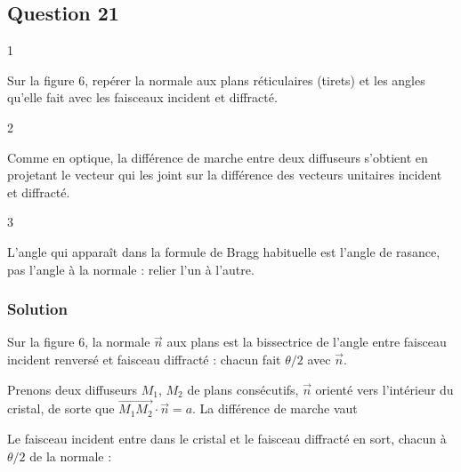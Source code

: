 \documentclass[11pt,a4paper]{article}
\newcommand{\equationajustee}[1]{%
  \sbox{\boiteequation}{$\displaystyle #1$}%
  \ifdim\wd\boiteequation>\linewidth
    \[\resizebox{\linewidth}{!}{\usebox{\boiteequation}}\]%
  \else
    \[#1\]%
  \fi}
\begin{document}
\hypertarget{question-21}{%
\subsection{Question 21}\label{question-21}}

\begin{indication}{1}

Sur la figure 6, repérer la normale aux plans réticulaires (tirets) et les angles qu'elle fait avec les faisceaux incident et diffracté.

\end{indication}

\begin{indication}{2}

Comme en optique, la différence de marche entre deux diffuseurs s'obtient en projetant le vecteur qui les joint sur la différence des vecteurs unitaires incident et diffracté.

\end{indication}

\begin{indication}{3}

L'angle qui apparaît dans la formule de Bragg habituelle est l'angle de rasance, pas l'angle à la normale : relier l'un à l'autre.

\end{indication}

\hypertarget{solution-20}{%
\subsubsection{Solution}\label{solution-20}}

Sur la figure 6, la normale \(\vec n\) aux plans est la bissectrice de l'angle entre faisceau incident renversé et faisceau diffracté : chacun fait \(\theta/2\) avec \(\vec n\).

Prenons deux diffuseurs \(M_1\), \(M_2\) de plans consécutifs, \(\vec n\) orienté vers l'intérieur du cristal, de sorte que \(\overrightarrow{M_1M_2}\cdot\vec n=a\). La différence de marche vaut

\equationajustee{\delta=(\vec u_i-\vec u_d)\cdot\overrightarrow{M_1M_2}.}

Le faisceau incident entre dans le cristal et le faisceau diffracté en sort, chacun à \(\theta/2\) de la normale :

\equationajustee{\begin{aligned}
\vec u_i\cdot\vec n&=\cos\frac\theta2,\\
\vec u_d\cdot\vec n&=-\cos\frac\theta2.
\end{aligned}}
\end{document}
